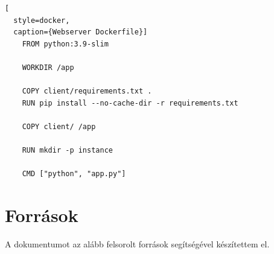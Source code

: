 \documentclass[12pt]{article}
\begin{document}
\begin{lstlisting}[
  style=docker,
  caption={Webserver Dockerfile}]
    FROM python:3.9-slim
    
    WORKDIR /app
    
    COPY client/requirements.txt .
    RUN pip install --no-cache-dir -r requirements.txt
    
    COPY client/ /app
    
    RUN mkdir -p instance
    
    CMD ["python", "app.py"]
\end{lstlisting}

\section{Források}

A dokumentumot az alább felsorolt források segítségével készítettem el.
\end{document}
